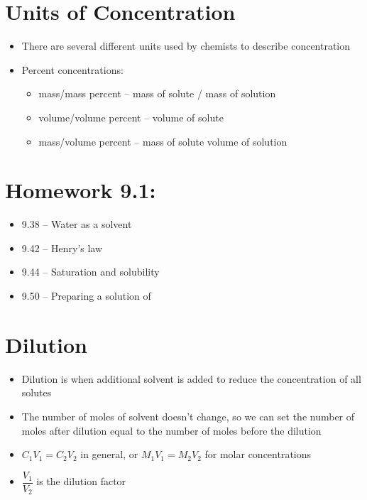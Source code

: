 \documentclass[12pt, openany, letterpaper]{memoir}
\begin{document}
\section{Units of Concentration}
\begin{itemize}
	\item There are several different units used by chemists to describe concentration
	\item Percent concentrations:
	      \begin{itemize}
		      \item mass/mass percent -- mass of solute / mass of solution
		      \item volume/volume percent -- volume of solute
		      \item mass/volume percent -- mass of solute volume of solution
	      \end{itemize}
\end{itemize}

\section*{Homework 9.1:} %
\begin{itemize}
	\item 9.38 -- Water as a solvent
	\item 9.42 -- Henry's law
	\item 9.44 -- Saturation and solubility
	\item 9.50 -- Preparing a solution of 
\end{itemize}

\section{Dilution}
\begin{itemize}
	\item Dilution is when additional solvent is added to reduce the concentration of all solutes
	\item The number of moles of solvent doesn't change, so we can set the number of moles after dilution equal to the number of moles before the dilution
	\item $C_1V_1=C_2V_2$ in general, or $M_1V_1=M_2V_2$ for molar concentrations
	\item $\dfrac{V_1}{V_2}$ is the dilution factor
\end{itemize}
\end{document}
